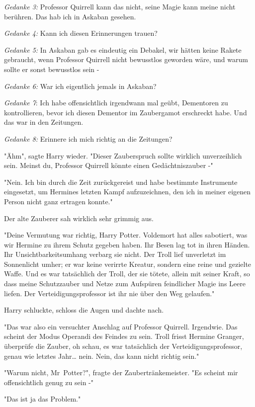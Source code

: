{\emph{Gedanke 3:} Professor Quirrell kann das nicht, seine Magie kann meine nicht berühren. Das hab ich in Askaban gesehen.

\emph{Gedanke 4:} Kann ich diesen Erinnerungen trauen?

\emph{Gedanke 5:} In Askaban gab es eindeutig ein Debakel, wir hätten keine Rakete gebraucht, wenn Professor Quirrell nicht bewusstlos geworden wäre, und warum sollte er sonst bewusstlos sein -

\emph{Gedanke 6:} War ich eigentlich jemals in Askaban?

\emph{Gedanke 7}: Ich habe offensichtlich irgendwann mal geübt, Dementoren zu kontrollieren, bevor ich diesen Dementor im Zaubergamot erschreckt habe. Und das war in den Zeitungen.

\emph{Gedanke 8:} Erinnere ich mich richtig an die Zeitungen?

"Ähm", sagte Harry wieder. "Dieser Zauberspruch sollte wirklich unverzeihlich sein. Meinst du, Professor Quirrell könnte einen Gedächtniszauber -"

"Nein. Ich bin durch die Zeit zurückgereist und habe bestimmte Instrumente eingesetzt, um Hermines letzten Kampf aufzuzeichnen, den ich in meiner eigenen Person nicht ganz ertragen konnte."

Der alte Zauberer sah wirklich sehr grimmig aus.

"Deine Vermutung war richtig, Harry Potter. Voldemort hat alles sabotiert, was wir Hermine zu ihrem Schutz gegeben haben. Ihr Besen lag tot in ihren Händen. Ihr Unsichtbarkeitsumhang verbarg sie nicht. Der Troll lief unverletzt im Sonnenlicht umher; er war keine verirrte Kreatur, sondern eine reine und gezielte Waffe. Und es war tatsächlich der Troll, der sie tötete, allein mit seiner Kraft, so dass meine Schutzzauber und Netze zum Aufspüren feindlicher Magie ins Leere liefen. Der Verteidigungsprofessor ist ihr nie über den Weg gelaufen."

Harry schluckte, schloss die Augen und dachte nach.

"Das war also ein versuchter Anschlag auf Professor Quirrell. Irgendwie. Das scheint der Modus Operandi des Feindes zu sein. Troll frisst Hermine Granger, überprüfe die Zauber, oh schau, es war tatsächlich der Verteidigungsprofessor, genau wie letztes Jahr… nein. Nein, das kann nicht richtig sein."

"Warum nicht, Mr~Potter?", fragte der Zaubertränkemeister. "Es scheint mir offensichtlich genug zu sein -"

"Das ist ja das Problem."

}
